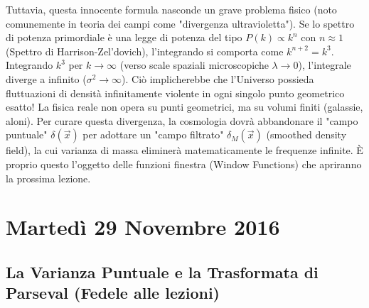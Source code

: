 \documentclass[11pt,a4paper]{report}
\begin{document}
Tuttavia, questa innocente formula nasconde un grave problema fisico (noto comunemente in teoria dei campi come "divergenza ultravioletta"). Se lo spettro di potenza primordiale è una legge di potenza del tipo $P(k) \propto k^n$ con $n \approx 1$ (Spettro di Harrison-Zel'dovich), l'integrando si comporta come $k^{n+2} = k^3$. 
Integrando $k^3$ per $k \to \infty$ (verso scale spaziali microscopiche $\lambda \to 0$), l'integrale diverge a infinito ($\sigma^2 \to \infty$). 
Ciò implicherebbe che l'Universo possieda fluttuazioni di densità infinitamente violente in ogni singolo punto geometrico esatto! 
La fisica reale non opera su punti geometrici, ma su volumi finiti (galassie, aloni). Per curare questa divergenza, la cosmologia dovrà abbandonare il "campo puntuale" $\delta(\vec{x})$ per adottare un "campo filtrato" $\delta_M(\vec{x})$ (smoothed density field), la cui varianza di massa eliminerà matematicamente le frequenze infinite. È proprio questo l'oggetto delle funzioni finestra (Window Functions) che apriranno la prossima lezione.

\chapter{Martedì 29 Novembre 2016}

\section{La Varianza Puntuale e la Trasformata di Parseval (Fedele alle lezioni)}
\end{document}
